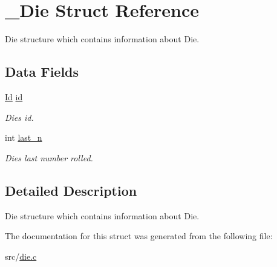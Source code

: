 \hypertarget{struct__Die}{}\section{\+\_\+\+Die Struct Reference}
\label{struct__Die}


Die structure which contains information about Die.  


\subsection*{Data Fields}
\begin{DoxyCompactItemize}
\item 
\mbox{\label{struct__Die_a0887af562dda760409957f13619d36f1}} 
\hyperlink{types_8h_a845e604fb28f7e3d97549da3448149d3}{Id} \hyperlink{struct__Die_a0887af562dda760409957f13619d36f1}{id}
\begin{DoxyCompactList}\small\item\em Die\textquotesingle{}s id. \end{DoxyCompactList}\item 
\mbox{\label{struct__Die_abf73744a544920c64d79d84d964be62d}} 
int \hyperlink{struct__Die_abf73744a544920c64d79d84d964be62d}{last\+\_\+n}
\begin{DoxyCompactList}\small\item\em Die\textquotesingle{}s last number rolled. \end{DoxyCompactList}\end{DoxyCompactItemize}


\subsection{Detailed Description}
Die structure which contains information about Die. 

The documentation for this struct was generated from the following file\+:\begin{DoxyCompactItemize}
\item 
src/\hyperlink{die_8c}{die.\+c}\end{DoxyCompactItemize}
